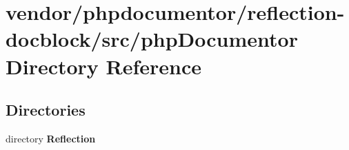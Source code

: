 \section{vendor/phpdocumentor/reflection-\/docblock/src/php\+Documentor Directory Reference}
\label{dir_3cabcbf7ed6e7474c4d822f58b78b532}
\subsection*{Directories}
\begin{DoxyCompactItemize}
\item 
directory {\bf Reflection}
\end{DoxyCompactItemize}
